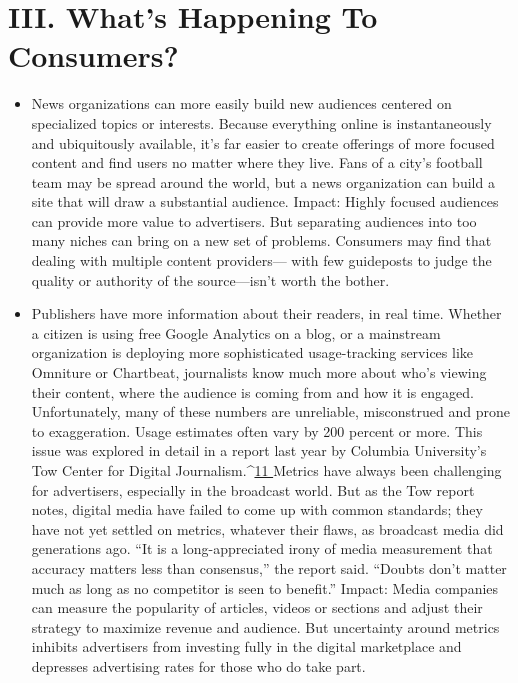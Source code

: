 \section{III. What’s Happening To Consumers?}
\begin{itemize}
\item News organizations can more easily build new audiences centered on
specialized topics or interests. Because everything online is instantaneously
and ubiquitously available, it’s far easier to create offerings of more focused
content and find users no matter where they live. Fans of a city’s football
team may be spread around the world, but a news organization can build a
site that will draw a substantial audience.
Impact: Highly focused audiences can provide more value to advertisers. But
separating audiences into too many niches can bring on a new set of problems.
Consumers may find that dealing with multiple content providers—
with few guideposts to judge the quality or authority of the source—isn’t
worth the bother.
\item Publishers have more information about their readers, in real time.
Whether a citizen is using free Google Analytics on a blog, or a mainstream
organization is deploying more sophisticated usage-tracking services like
Omniture or Chartbeat, journalists know much more about who’s viewing
their content, where the audience is coming from and how it is engaged.
Unfortunately, many of these numbers are unreliable, misconstrued
and prone to exaggeration. Usage estimates often vary by 200 percent or
more. This issue was explored in detail in a report last year by Columbia
University’s Tow Center for Digital Journalism.^{\href{#endnotes-ch1}{11 }}Metrics have always been
challenging for advertisers, especially in the broadcast world. But as the Tow
report notes, digital media have failed to come up with common standards;
they have not yet settled on metrics, whatever their flaws, as broadcast media
did generations ago. ``It is a long-appreciated irony of media measurement
that accuracy matters less than consensus,'' the report said. ``Doubts don’t
matter much as long as no competitor is seen to benefit.''
Impact: Media companies can measure the popularity of articles, videos or
sections and adjust their strategy to maximize revenue and audience. But uncertainty
around metrics inhibits advertisers from investing fully in the digital
marketplace and depresses advertising rates for those who do take part.


\end{itemize}
